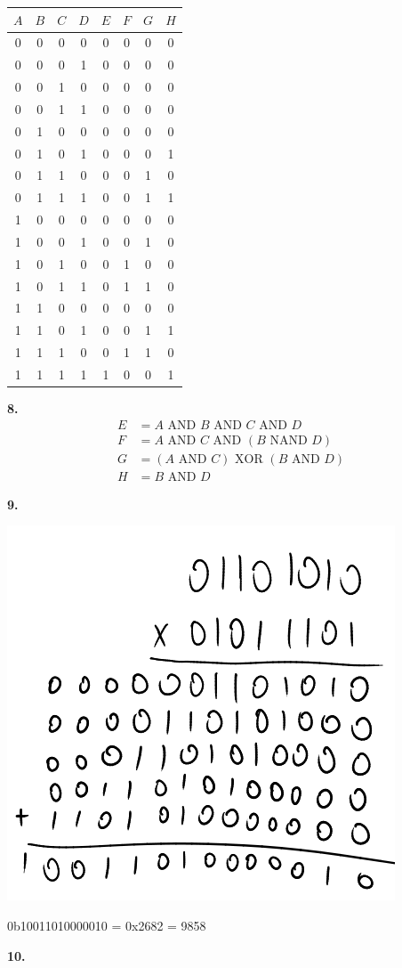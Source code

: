 \documentclass{article}
\begin{document}
    \begin{center}\begin{tabular}{| c | c | c | c | c | c | c | c |}
        \hline
        $A$ & $B$ & $C$ & $D$ & $E$ & $F$ & $G$ & $H$ \\
        \hline
        0 & 0 & 0 & 0 & 0 & 0 & 0 & 0 \\
        0 & 0 & 0 & 1 & 0 & 0 & 0 & 0 \\
        0 & 0 & 1 & 0 & 0 & 0 & 0 & 0 \\
        0 & 0 & 1 & 1 & 0 & 0 & 0 & 0 \\
        0 & 1 & 0 & 0 & 0 & 0 & 0 & 0 \\
        0 & 1 & 0 & 1 & 0 & 0 & 0 & 1 \\
        0 & 1 & 1 & 0 & 0 & 0 & 1 & 0 \\
        0 & 1 & 1 & 1 & 0 & 0 & 1 & 1 \\
        1 & 0 & 0 & 0 & 0 & 0 & 0 & 0 \\
        1 & 0 & 0 & 1 & 0 & 0 & 1 & 0 \\
        1 & 0 & 1 & 0 & 0 & 1 & 0 & 0 \\
        1 & 0 & 1 & 1 & 0 & 1 & 1 & 0 \\
        1 & 1 & 0 & 0 & 0 & 0 & 0 & 0 \\
        1 & 1 & 0 & 1 & 0 & 0 & 1 & 1 \\
        1 & 1 & 1 & 0 & 0 & 1 & 1 & 0 \\
        1 & 1 & 1 & 1 & 1 & 0 & 0 & 1 \\
        \hline
    \end{tabular}\end{center}

\medskip\noindent\textbf{8.}
\begin{align*}
    E &= A \text{ AND } B \text{ AND } C \text{ AND } D \\
    F &= A \text{ AND } C \text{ AND } (B \text{ NAND } D) \\
    G &= (A \text{ AND } C) \text{ XOR } (B \text{ AND } D) \\
    H &= B \text{ AND } D
\end{align*}

\newpage\noindent\textbf{9.}

    \begin{center}\includegraphics[scale=.5]{multiplication.png}\end{center}

    0b10011010000010 = 0x2682 = 9858

\medskip\noindent\textbf{10.}

    
\end{document}
